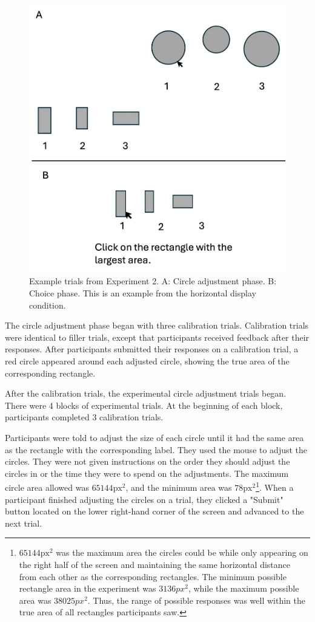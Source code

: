 \begin{figure}
   \centering
   \includegraphics[width=\linewidth]{figures/circle_exp_display.jpg}
   \caption{Example trials from Experiment 2. A: Circle adjustment phase. B: Choice phase. This is an example from the horizontal display condition.}
   \label{fig:circle_exp_display}
\end{figure}

The circle adjustment phase began with three calibration trials. Calibration trials were identical to filler trials, except that participants received feedback after their responses. After participants submitted their responses on a calibration trial, a red circle appeared around each adjusted circle, showing the true area of the corresponding rectangle.  

After the calibration trials, the experimental circle adjustment trials began. There were 4 blocks of experimental trials. At the beginning of each block, participants completed $3$ calibration trials. 

Participants were told to adjust the size of each circle until it had the same area as the rectangle with the corresponding label. They used the mouse to adjust the circles. They were not given instructions on the order they should adjust the circles in or the time they were to spend on the adjustments. The maximum circle area allowed was $65144 \text{px}^2$, and the minimum area was $78 \text{px}^2$\footnote{$65144 \text{px}^2$ was the maximum area the circles could be while only appearing on the right half of the screen and maintaining the same horizontal distance from each other as the corresponding rectangles. The minimum possible rectangle area in the experiment was $3136px^2$, while the maximum possible area was $38025px^2$. Thus, the range of possible responses was well within the true area of all rectangles participants saw.}. When a participant finished adjusting the circles on a trial, they clicked a "Submit" button located on the lower right-hand corner of the screen and advanced to the next trial. 

